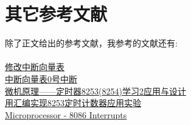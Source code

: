 \documentclass{LabReport}
\begin{document}
	\section{其它参考文献}
	除了正文给出的参考文献，我参考的文献还有:\\\\
	\href{https://blog.csdn.net/qq_45931661/article/details/120576061?ops_request_misc=%257B%2522request%255Fid%2522%253A%2522171152047516800197016756%2522%252C%2522scm%2522%253A%252220140713.130102334..%2522%257D&request_id=171152047516800197016756&biz_id=0&utm_medium=distribute.pc_search_result.none-task-blog-2~all~baidu_landing_v2~default-1-120576061-null-null.142^v100^pc_search_result_base5&utm_term=%E4%BF%AE%E6%94%B9%E4%B8%AD%E6%96%AD%E5%90%91%E9%87%8F%E8%A1%A8&spm=1018.2226.3001.4187}{修改中断向量表}\\
	\hspace{2em}\href{https://blog.csdn.net/u011624903/article/details/121675034}{中断向量表0号中断}\\
	\href{https://blog.csdn.net/qq_61870465/article/details/134751137}{微机原理——定时器8253(8254)学习2应用与设计}\\
	\href{https://blog.csdn.net/qq_43645782/article/details/106339443?ops_request_misc=%257B%2522request%255Fid%2522%253A%2522171154013116800182726689%2522%252C%2522scm%2522%253A%252220140713.130102334.pc%255Fall.%2522%257D&request_id=171154013116800182726689&biz_id=0&utm_medium=distribute.pc_search_result.none-task-blog-2~all~first_rank_ecpm_v1~rank_v31_ecpm-15-106339443-null-null.142^v100^pc_search_result_base5&utm_term=%E6%B1%87%E7%BC%96%E5%88%A9%E7%94%A8%E6%97%B6%E9%92%9F8253%E4%B8%AD%E6%96%AD&spm=1018.2226.3001.4187}{用汇编实现8253定时计数器应用实验}\\
	\href{https://www.tutorialspoint.com/microprocessor/microprocessor_8086_interrupts.htm}{Microprocessor - 8086 Interrupts}
	
\end{document}
